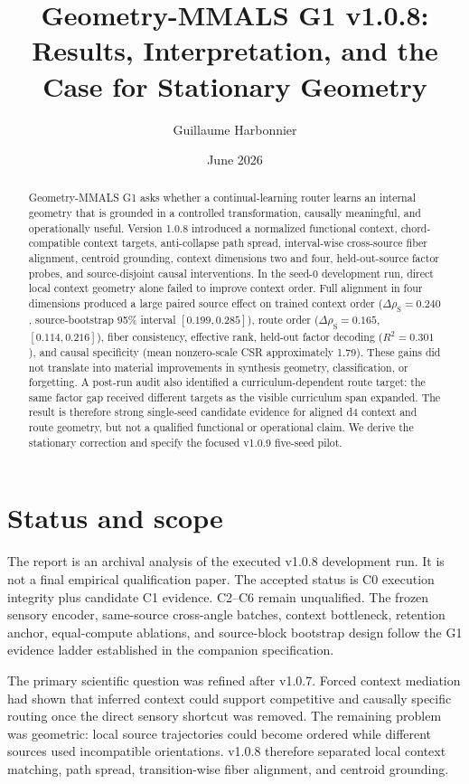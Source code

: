 \documentclass[10pt]{article}
\title{Geometry-MMALS G1 v1.0.8: Results, Interpretation, and the Case for Stationary Geometry}
\author{Guillaume Harbonnier}
\date{June 2026}
\newcommand{\rhoS}{\rho_{\mathrm{S}}}
\begin{document}
\maketitle

\begin{abstract}
Geometry-MMALS G1 asks whether a continual-learning router learns an internal geometry that is grounded in a controlled transformation, causally meaningful, and operationally useful. Version 1.0.8 introduced a normalized functional context, chord-compatible context targets, anti-collapse path spread, interval-wise cross-source fiber alignment, centroid grounding, context dimensions two and four, held-out-source factor probes, and source-disjoint causal interventions. In the seed-0 development run, direct local context geometry alone failed to improve context order. Full alignment in four dimensions produced a large paired source effect on trained context order ($\Delta\rhoS=0.240$, source-bootstrap 95\% interval $[0.199,0.285]$), route order ($\Delta\rhoS=0.165$, $[0.114,0.216]$), fiber consistency, effective rank, held-out factor decoding ($R^2=0.301$), and causal specificity (mean nonzero-scale CSR approximately 1.79). These gains did not translate into material improvements in synthesis geometry, classification, or forgetting. A post-run audit also identified a curriculum-dependent route target: the same factor gap received different targets as the visible curriculum span expanded. The result is therefore strong single-seed candidate evidence for aligned d4 context and route geometry, but not a qualified functional or operational claim. We derive the stationary correction and specify the focused v1.0.9 five-seed pilot.
\end{abstract}

\section{Status and scope}
The report is an archival analysis of the executed v1.0.8 development run. It is not a final empirical qualification paper. The accepted status is C0 execution integrity plus candidate C1 evidence. C2--C6 remain unqualified. The frozen sensory encoder, same-source cross-angle batches, context bottleneck, retention anchor, equal-compute ablations, and source-block bootstrap design follow the G1 evidence ladder established in the companion specification.

The primary scientific question was refined after v1.0.7. Forced context mediation had shown that inferred context could support competitive and causally specific routing once the direct sensory shortcut was removed. The remaining problem was geometric: local source trajectories could become ordered while different sources used incompatible orientations. v1.0.8 therefore separated local context matching, path spread, transition-wise fiber alignment, and centroid grounding.
\end{document}
